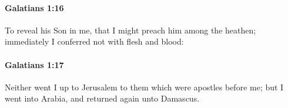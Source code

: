 		\paragraph{Galatians 1:16} %
			\label{GALATIANS-1-16}

			To reveal his Son in me, that I might preach him among the heathen; immediately I conferred not with flesh and blood:

			\begin{framed}
			\scriptsize
				\begin{compactdesc}
					\item[SBLG] 
				\end{compactdesc}
			\end{framed}

		\paragraph{Galatians 1:17} %
			\label{GALATIANS-1-17}

			Neither went I up to Jerusalem to them which were apostles before me; but I went into Arabia, and returned again unto Damascus.

